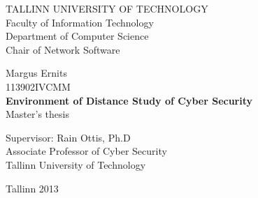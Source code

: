 \begin{titlepage}
	\begingroup
		\singlespace
		\begin{center}
			TALLINN UNIVERSITY OF TECHNOLOGY \\
			Faculty of Information Technology \\
			Department of Computer Science \\
			Chair of Network Software
		
			\vfill
				Margus Ernits \\
				113902IVCMM \\[1.5cm]
				\LARGE \textbf{Environment of Distance Study of Cyber Security} \\[1cm]
				\normalsize Master's thesis \\[4cm]

				\begin{flushright}
					Supervisor: Rain Ottis, Ph.D \\
					Associate Professor of Cyber Security \\
					Tallinn University of Technology
					
				\end{flushright}
			\vfill

			Tallinn 2013
		\end{center}
	\endgroup
\end{titlepage}